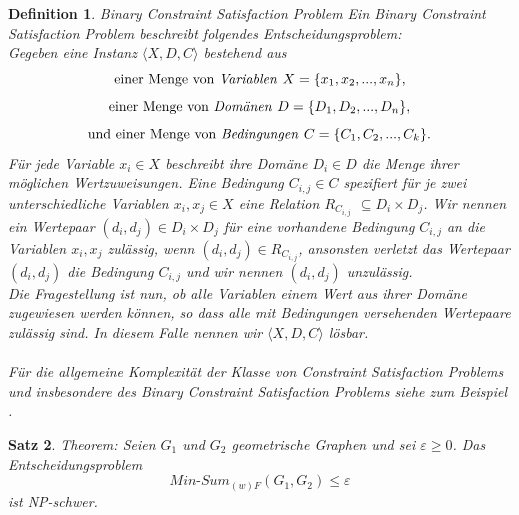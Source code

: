 \documentclass[a4paper, 12pt, twoside]{article}
\theoremstyle{Format1} %
\newtheorem{Def}{Definition}[section]       %
\newtheorem{Satz}[Def]{Satz}                %
\begin{document}
\begin{Def}
	Binary Constraint Satisfaction Problem
	Ein \textit{Binary Constraint Satisfaction Problem} beschreibt folgendes Entscheidungsproblem:
	\\
	Gegeben eine Instanz $\langle X,D,C \rangle$ bestehend aus
	$$ \text{einer Menge von \textit{Variablen }}X = \{x_1, x_2, ..., x_n\}, $$
	$$ \text{einer Menge von \textit{Domänen }}D = \{D_1, D_2, ..., D_n\}, $$
	$$ \text{und einer Menge von \textit{Bedingungen }}C = \{C_1, C_2, ..., C_k\}. $$
	Für jede Variable $ x_i \in X$ beschreibt ihre Domäne $ D_i \in D$ die Menge ihrer möglichen Wertzuweisungen.
	Eine Bedingung $C_{i,j} \in C$ spezifiert für je zwei unterschiedliche Variablen $x_i, x_j \in X$ eine Relation $R_{C_{i,j}}$ $\subseteq D_i \times D_j$.
	Wir nennen ein Wertepaar $(d_i, d_j) \in D_i \times D_j$ für eine vorhandene Bedingung $C_{i,j}$ an die Variablen $x_i,x_j$ \textit{zulässig}, wenn $(d_i,d_j) \in R_{C_{i,j}}$,
	ansonsten \textit{verletzt} das Wertepaar $(d_i, d_j)$ die Bedingung $C_{i,j}$ und wir nennen $(d_i,d_j)$ \textit{unzulässig}.
	\\
	Die Fragestellung ist nun, ob alle Variablen einem Wert aus ihrer Domäne zugewiesen werden können, so dass alle mit Bedingungen versehenden Wertepaare zulässig sind.
	In diesem Falle nennen wir $\langle X,D,C \rangle$ \textit{lösbar}.
	\\
	\\
	Für die allgemeine Komplexität der Klasse von \textit{Constraint Satisfaction Problems} und insbesondere des
	\textit{Binary Constraint Satisfaction Problems} siehe zum Beispiel \cite{Karp}.
\end{Def}

\begin{Satz} \label{Satz NP-Schwerheit}
	Theorem: Seien $G_1$ und $G_2$ geometrische Graphen und sei $\varepsilon \geq 0$.
	Das Entscheidungsproblem $$ \textit{Min-Sum}_{(w)F}(G_1, G_2) \leq  \varepsilon $$ ist NP-schwer.
\end{Satz}
\end{document}
